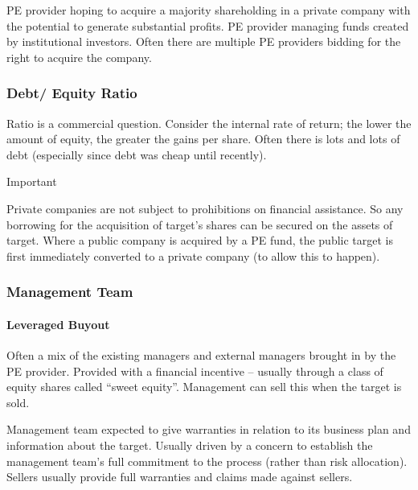 \documentclass[
]{article}
\newenvironment{env-3d391c14-39bb-45b0-8b12-18b66560aec4}
{
    \savenotes\tcolorbox[blanker,breakable,left=5pt,borderline west={2pt}{-4pt}{cyan}]
}
{
    \endtcolorbox\spewnotes
}
\begin{document}
PE provider hoping to acquire a majority shareholding in a private
company with the potential to generate substantial profits. PE provider
managing funds created by institutional investors. Often there are
multiple PE providers bidding for the right to acquire the company.

\hypertarget{debt-equity-ratio}{%
\subsubsection{Debt/ Equity Ratio}\label{debt-equity-ratio}}

Ratio is a commercial question. Consider the internal rate of return;
the lower the amount of equity, the greater the gains per share. Often
there is lots and lots of debt (especially since debt was cheap until
recently).

\begin{env-3d391c14-39bb-45b0-8b12-18b66560aec4}

Important

Private companies are not subject to prohibitions on financial
assistance. So any borrowing for the acquisition of target's shares can
be secured on the assets of target. Where a public company is acquired
by a PE fund, the public target is first immediately converted to a
private company (to allow this to happen).

\end{env-3d391c14-39bb-45b0-8b12-18b66560aec4}

\hypertarget{management-team}{%
\subsubsection{Management Team}\label{management-team}}

\hypertarget{leveraged-buyout}{%
\paragraph{Leveraged Buyout}\label{leveraged-buyout}}

Often a mix of the existing managers and external managers brought in by
the PE provider. Provided with a financial incentive -- usually through
a class of equity shares called ``sweet equity''. Management can sell
this when the target is sold.

Management team expected to give warranties in relation to its business
plan and information about the target. Usually driven by a concern to
establish the management team's full commitment to the process (rather
than risk allocation). Sellers usually provide full warranties and
claims made against sellers.
\end{document}

